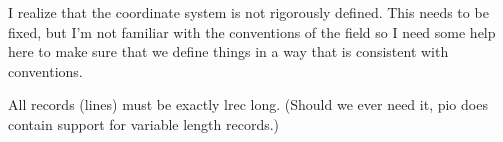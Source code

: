 \documentclass{article}
\begin{document}
I realize that the coordinate system is not rigorously defined.  This
needs to be fixed, but I'm not familiar with the conventions of the
field so I need some help here to make sure that we define things in a
way that is consistent with conventions.

All records (lines) must be exactly lrec long.  (Should we ever need it,
pio does contain support for variable length records.)
\end{document}
